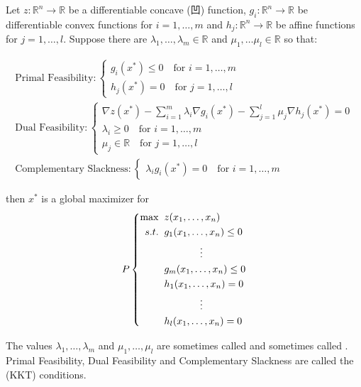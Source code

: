 \begin{theorem} Let $z : \mathbb{R}^n \rightarrow \mathbb{R}$ be a differentiable concave (凹) function, $g_i:\mathbb{R}^n \rightarrow \mathbb{R}$ be differentiable convex functions for $i = 1,\dots,m$ and $h_j:\mathbb{R}^n \rightarrow \mathbb{R}$ be affine functions for $j=1,\dots,l$. Suppose there are $\lambda_1,\dots,\lambda_m \in \mathbb{R}$ and $\mu_1,\dots\mu_l \in \mathbb{R}$ so that:

\begin{gather*}
\text{Primal Feasibility}: \left\{
\begin{aligned}
g_i({x}^*) \leq 0 \quad \text{for $i = 1,\dots,m$}\\
h_j({x}^*) = 0 \quad \text{for $j = 1,\dots,l$}
\end{aligned}
\right.\\
\text{Dual Feasibility}:\left\{
\begin{aligned}
\nabla z({x}^*) - \sum_{i = 1}^m\lambda_i\nabla g_i({x}^*) - \sum_{j = 1}^{l}\mu_j\nabla h_j({x}^*) = {0}\\
\lambda_i \geq 0 \quad \text{for $i=1,\dots,m$}\\
\mu_j \in \mathbb{R} \quad \text{for $j = 1,\dots,l$}
\end{aligned}
\right.\\
\text{Complementary Slackness}:\left\{
\begin{aligned}
\lambda_ig_i({x}^*) = 0 \quad \text{for $i = 1,\dots,m$}
\end{aligned}
\right.
\end{gather*}

then ${x}^*$ is a global maximizer for 
\begin{equation}
P\left\{
\begin{aligned}
\max\;\;& z(x_1,\dots,x_n)\\
s.t.\;\;& g_1(x_1,\dots,x_n) \leq 0\\
& \hspace*{0.5in}\vdots\\
& g_m(x_1,\dots,x_n) \leq 0\\
& h_1(x_1,\dots,x_n) = 0\\
&\hspace*{0.5in}\vdots\\
&h_l(x_1,\dots,x_n) = 0
\end{aligned}
\right.
\end{equation}
\label{thm:KKT8}
\end{theorem}

The values $\lambda_1,\dots,\lambda_m$ and $\mu_1,\dots,\mu_l$ are sometimes called  and sometimes called . Primal Feasibility, Dual Feasibility and Complementary Slackness are called the  (KKT) conditions.

